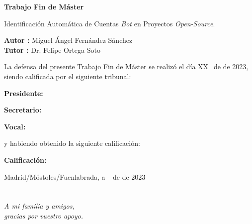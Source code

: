 \documentclass[a4paper, 12pt]{book}
\begin{document}
\vspace{-4cm}
\begin{center}
\LARGE
\textbf{Trabajo Fin de Máster}

\vspace{1cm}
\large
Identificación Automática de Cuentas \textit{Bot} en Proyectos \textit{Open-Source}.

\vspace{1cm}
\large
\textbf{Autor :} Miguel Ángel Fernández Sánchez \\
\textbf{Tutor :} Dr. Felipe Ortega Soto

\end{center}

\vspace{1cm}
La defensa del presente Trabajo Fin de Máster se realizó el día XX\qquad$\;\,$ de
\qquad\qquad\qquad\qquad \newline de 2023, siendo calificada por el siguiente tribunal:


\vspace{0.5cm}
\textbf{Presidente:}

\vspace{0.8cm}
\textbf{Secretario:}

\vspace{0.8cm}
\textbf{Vocal:}


\vspace{0.8cm}
y habiendo obtenido la siguiente calificación:

\vspace{0.8cm}
\textbf{Calificación:}


\vspace{0.8cm}
\begin{flushright}
Madrid/Móstoles/Fuenlabrada, a \qquad$\;\,$ de \qquad\qquad\qquad\qquad de 2023
\end{flushright}


\chapter*{}
\begin{flushright}
\textit{A mi familia y amigos, \\
gracias por vuestro apoyo.}
\end{flushright}

\vspace{2cm}
\end{document}
